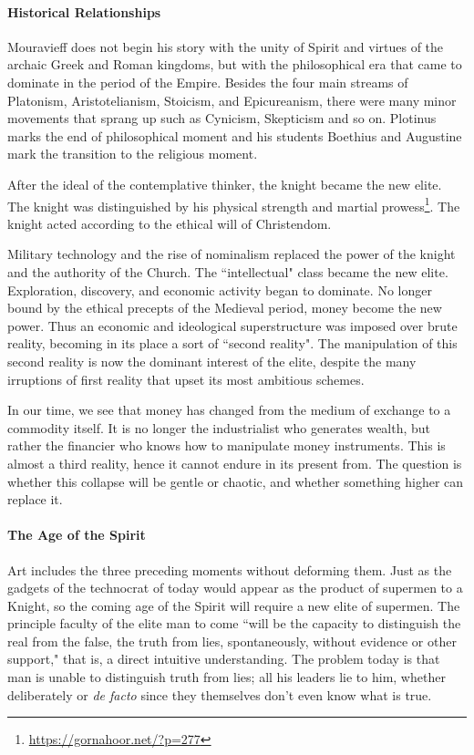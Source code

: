 \paragraph{Historical Relationships}
Mouravieff does not begin his story with the unity of Spirit and virtues of the archaic Greek and Roman kingdoms, but with the philosophical era that came to dominate in the period of the Empire. Besides the four main streams of Platonism, Aristotelianism, Stoicism, and Epicureanism, there were many minor movements that sprang up such as Cynicism, Skepticism and so on. Plotinus marks the end of philosophical moment and his students Boethius and Augustine mark the transition to the religious moment.

After the ideal of the contemplative thinker, the knight became the new elite. The knight was distinguished by his physical strength and martial prowess\footnote{\url{https://gornahoor.net/?p=277}}. The knight acted according to the ethical will of Christendom.

Military technology and the rise of nominalism replaced the power of the knight and the authority of the Church. The ``intellectual" class became the new elite. Exploration, discovery, and economic activity began to dominate. No longer bound by the ethical precepts of the Medieval period, money become the new power. Thus an economic and ideological superstructure was imposed over brute reality, becoming in its place a sort of ``second reality". The manipulation of this second reality is now the dominant interest of the elite, despite the many irruptions of first reality that upset its most ambitious schemes.

In our time, we see that money has changed from the medium of exchange to a commodity itself. It is no longer the industrialist who generates wealth, but rather the financier who knows how to manipulate money instruments. This is almost a third reality, hence it cannot endure in its present from. The question is whether this collapse will be gentle or chaotic, and whether something higher can replace it.

\paragraph{The Age of the Spirit}
Art includes the three preceding moments without deforming them. Just as the gadgets of the technocrat of today would appear as the product of supermen to a Knight, so the coming age of the Spirit will require a new elite of supermen. The principle faculty of the elite man to come ``will be the capacity to distinguish the real from the false, the truth from lies, spontaneously, without evidence or other support," that is, a direct intuitive understanding. The problem today is that man is unable to distinguish truth from lies; all his leaders lie to him, whether deliberately or \emph{de facto} since they themselves don't even know what is true.

